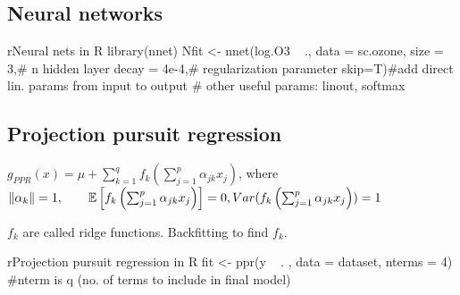 \subsection{Neural networks}
\begin{codebox}{r}{Neural nets in R}
library(nnet)
Nfit <- nnet(log.O3 ~ ., data = sc.ozone,
  size = 3,# n hidden layer
  decay = 4e-4,# regularization parameter
  skip=T)#add direct lin. params from input to output
  # other useful params: linout, softmax
\end{codebox}
\subsection{Projection pursuit regression}
\begin{center}
$g_{PPR}(x)=\mu + \sum_{k=1}^qf_k\left(\sum_{j=1}^p\alpha_{jk}x_j\right)$, where\\
$\Vert\alpha_k\Vert=1,\qquad\mathbb{E}\left[f_k\left(\sum_{j=1}^p\alpha_{jk}x_j\right)\right] =0,Var(f_k\left(\sum_{j=1}^p\alpha_{jk}x_j\right)) =1$
\end{center}
$f_k$ are called ridge functions. Backfitting to find $f_k$.
\begin{codebox}{r}{Projection pursuit regression in R}
fit <- ppr(y ~ . , data = dataset, nterms = 4)
#nterm is q (no. of terms to include in final model)
\end{codebox}

